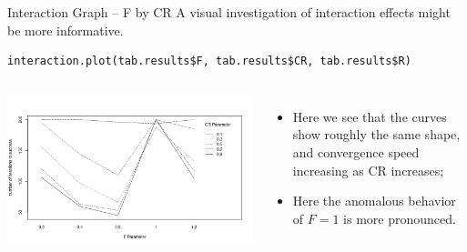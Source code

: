 \begin{frame}[t,fragile]{Interaction Graph -- F by CR}{}
  A visual investigation of interaction effects might be more informative.
\begin{verbatim}
interaction.plot(tab.results$F, tab.results$CR, tab.results$R)
\end{verbatim}

  \begin{columns}
    \includegraphics[width=\textwidth]{../img/interaction_DE_FbyCR.png}
    
    \begin{itemize}
    \item Here we see that the curves show roughly the same shape,
      and convergence speed increasing as CR increases;
    \item Here the anomalous behavior of $F=1$ is more pronounced.
    \end{itemize}
  \end{columns}
\end{frame}


